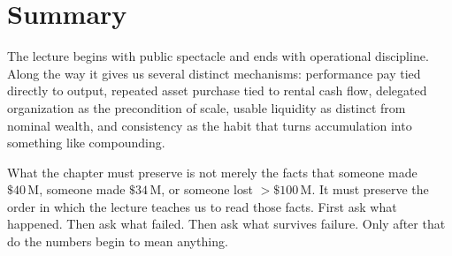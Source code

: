 \section{Summary}

The lecture begins with public spectacle and ends with operational discipline. Along the way it gives us several distinct mechanisms: performance pay tied directly to output, repeated asset purchase tied to rental cash flow, delegated organization as the precondition of scale, usable liquidity as distinct from nominal wealth, and consistency as the habit that turns accumulation into something like compounding.

What the chapter must preserve is not merely the facts that someone made \(\$40\,\mathrm{M}\), someone made \(\$34\,\mathrm{M}\), or someone lost \(>\$100\,\mathrm{M}\). It must preserve the order in which the lecture teaches us to read those facts. First ask what happened. Then ask what failed. Then ask what survives failure. Only after that do the numbers begin to mean anything.